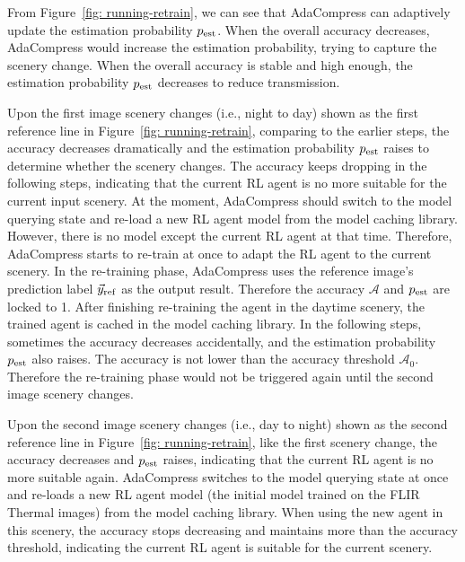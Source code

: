 From Figure~\ref{fig: running-retrain}, we can see that AdaCompress can adaptively update the estimation probability $ p_{\rm est} $. When the overall accuracy decreases, AdaCompress would increase the estimation probability, trying to capture the scenery change. When the overall accuracy is stable and high enough, the estimation probability $ p_{\rm est} $ decreases to reduce transmission. %

Upon the first image scenery changes (i.e., night to day) shown as the first reference line in Figure~\ref{fig: running-retrain}, comparing to the earlier steps, the accuracy decreases dramatically and the estimation probability $ p_{\rm est} $ raises to determine whether the scenery changes. The accuracy keeps dropping in the following steps, indicating that the current RL agent is no more suitable for the current input scenery. At the moment, AdaCompress should switch to the model querying state and re-load a new RL agent model from the model caching library. However, there is no model except the current RL agent at that time. Therefore, AdaCompress starts to re-train at once to adapt the RL agent to the current scenery. In the re-training phase, AdaCompress uses the reference image's prediction label $ \vec{y}_{\rm ref} $ as the output result. Therefore the accuracy $ \mathcal{A} $ and $ p_{\rm est} $ are locked to 1. After finishing re-training the agent in the daytime scenery, the trained agent is cached in the model caching library. In the following steps, sometimes the accuracy decreases accidentally, and the estimation probability $ p_{\rm est} $ also raises. The accuracy is not lower than the accuracy threshold $ \mathcal{A}_0 $. Therefore the re-training phase would not be triggered again until the second image scenery changes. %

Upon the second image scenery changes (i.e., day to night) shown as the second reference line in Figure~\ref{fig: running-retrain}, like the first scenery change, the accuracy decreases and $ p_{\rm est} $ raises, indicating that the current RL agent is no more suitable again. AdaCompress switches to the model querying state at once and re-loads a new RL agent model (the initial model trained on the FLIR Thermal images) from the model caching library. When using the new agent in this scenery, the accuracy stops decreasing and maintains more than the accuracy threshold, indicating the current RL agent is suitable for the current scenery.  %


